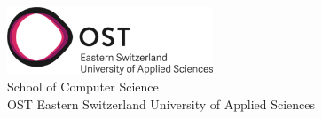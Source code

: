 \begin{titlepage}
\begin{center}
        \vspace{0.5cm}

        \includegraphics[height=2cm]{resources/ost-logo.png}\\

        \vspace{0.5cm}
        School of Computer Science\\
        OST Eastern Switzerland University of Applied Sciences

    \end{center}

\end{titlepage}
